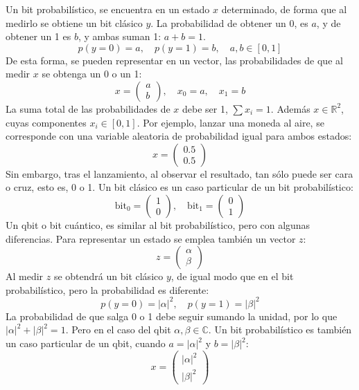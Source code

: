 \documentclass{article}
\newcommand*\mat[1]{ \begin{pmatrix} #1 \end{pmatrix}}
\theoremstyle{definition}
\begin{document}
Un bit probabilístico, se encuentra en un estado $x$ determinado, de forma que 
al medirlo se obtiene un bit clásico $y$. La probabilidad de obtener un 0, es 
$a$, y de obtener un 1 es $b$, y ambas suman 1: $a + b = 1$.
$$p(y = 0) = a, \quad p(y = 1) = b, \quad a,b \in [0, 1]$$
De esta forma, se pueden representar en un vector, las probabilidades de que al 
medir $x$ se obtenga un 0 o un 1:
$$ x = \mat{a \\ b}, \quad x_0 = a, \quad x_1 = b$$
La suma total de las probabilidades de $x$ debe ser 1, $\sum x_i = 1$. Además $x 
\in \mathbb{R}^2$, cuyas componentes $x_i \in [0,1]$.
Por ejemplo, lanzar una moneda al aire, se corresponde con una variable 
aleatoria de probabilidad igual para ambos estados:
$$ x = \mat{0.5 \\ 0.5} $$
Sin embargo, tras el lanzamiento, al observar el resultado, tan sólo puede ser 
cara o cruz, esto es, 0 o 1.
Un bit clásico es un caso particular de un bit probabilístico:
$$ \text{bit}_0 = \mat{1\\0}, \quad \text{bit}_1 = \mat{0\\1} $$
Un qbit o bit cuántico, es similar al bit probabilístico, pero con algunas 
diferencias. Para representar un estado se emplea también un vector $z$:
$$ z = \mat{\alpha \\ \beta}$$
Al medir $z$ se obtendrá un bit clásico $y$, de igual modo que en el bit 
probabilístico, pero la probabilidad es diferente:
$$p(y=0) = |\alpha|^2, \quad p(y=1) = |\beta|^2$$
La probabilidad de que salga 0 o 1 debe seguir sumando la unidad, por lo que 
$|\alpha|^2 + |\beta|^2 = 1$. Pero en el caso del qbit $\alpha, \beta \in 
\mathbb{C}$. Un bit probabilístico es también un caso particular de un qbit, 
cuando $a = |\alpha|^2$ y $b = |\beta|^2$:
$$ x = \mat{|\alpha|^2 \\ |\beta|^2}$$
\end{document}

